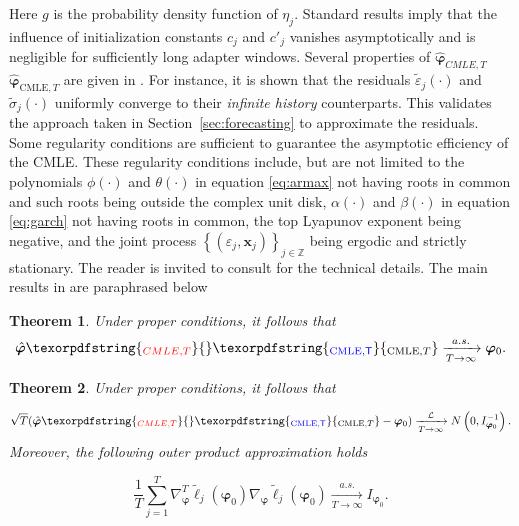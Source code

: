 \documentclass[10pt,a4paper,oneside]{article}
\newcommand{\Z}{\mathbb{Z}}
\newtheorem{theorem}{Theorem}
\providecommand{\DIFaddtex}[1]{{\protect\color{blue} \sf #1}} %
\providecommand{\DIFdeltex}[1]{{\protect\color{red} \scriptsize #1}} %
\providecommand{\DIFaddbegin}{} %
\providecommand{\DIFaddend}{} %
\providecommand{\DIFdelbegin}{} %
\providecommand{\DIFdelend}{} %
\providecommand{\DIFadd}[1]{\texorpdfstring{\DIFaddtex{#1}}{#1}} %
\providecommand{\DIFdel}[1]{\texorpdfstring{\DIFdeltex{#1}}{}} %
\newcommand{\DIFscaledelfig}{0.5}
\newlength{\DIFdelgraphicswidth} %
\newlength{\DIFdelgraphicsheight} %
\newcommand{\DIFaddincludegraphics}[2][]{{\color{blue}\fbox{\DIFOincludegraphics[#1]{#2}}}} %
\newcommand{\DIFdelincludegraphics}[2][]{%
\sbox{\DIFdelgraphicsbox}{\DIFOincludegraphics[#1]{#2}}%
\settoboxwidth{\DIFdelgraphicswidth}{\DIFdelgraphicsbox} %
\settoboxtotalheight{\DIFdelgraphicsheight}{\DIFdelgraphicsbox} %
\scalebox{\DIFscaledelfig}{%
\parbox[b]{\DIFdelgraphicswidth}{\usebox{\DIFdelgraphicsbox}\\[-\baselineskip] \rule{\DIFdelgraphicswidth}{0em}}\llap{\resizebox{\DIFdelgraphicswidth}{\DIFdelgraphicsheight}{%
\setlength{\unitlength}{\DIFdelgraphicswidth}%
\begin{picture}(1,1)%
\thicklines\linethickness{2pt} %
{\color[rgb]{1,0,0}\put(0,0){\framebox(1,1){}}}%
{\color[rgb]{1,0,0}\put(0,0){\line( 1,1){1}}}%
{\color[rgb]{1,0,0}\put(0,1){\line(1,-1){1}}}%
\end{picture}%
}\hspace*{3pt}}} %
} %
\DeclareRobustCommand{\DIFaddbegin}{\DIFOaddbegin \let\includegraphics\DIFaddincludegraphics} %
\DeclareRobustCommand{\DIFaddend}{\DIFOaddend \let\includegraphics\DIFOincludegraphics} %
\DeclareRobustCommand{\DIFdelbegin}{\DIFOdelbegin \let\includegraphics\DIFdelincludegraphics} %
\DeclareRobustCommand{\DIFdelend}{\DIFOaddend \let\includegraphics\DIFOincludegraphics} %
\begin{document}
Here $g$ is the probability density function of $\eta_j$. Standard results imply that the influence of initialization constants $c_j$ and $c'_j$ vanishes asymptotically and is negligible for sufficiently long adapter windows. Several properties of \DIFdelbegin \DIFdel{$\hat{\boldsymbol{\varphi}}_{CMLE, T}$ }\DIFdelend \DIFaddbegin \DIFadd{$\hat{\boldsymbol{\varphi}}_{\mathrm{CMLE}, T}$ }\DIFaddend are given in \cite{mejia2025asymptotic}. For instance, it is shown that the residuals $\tilde{\varepsilon}_j(\cdot)$ and $\tilde{\sigma}_j(\cdot)$ uniformly converge to their \textit{infinite history} counterparts. This validates the approach taken in Section~\ref{sec:forecasting} to approximate the residuals. Some regularity conditions are sufficient to guarantee the asymptotic efficiency of the CMLE. These regularity conditions include, but are not limited to the polynomials $\phi(\cdot)$ and $\theta(\cdot)$ in equation \eqref{eq:armax} not having roots in common and such roots being outside the complex unit disk, $\alpha(\cdot)$ and $\beta(\cdot)$ in equation \eqref{eq:garch} not having roots in common, the top Lyapunov exponent being negative, and the joint process $\left\{ \left( \varepsilon_j, \mathbf{x}_j \right)  \right\}_{j \in \Z}$ being ergodic and strictly stationary. The reader is invited to consult \cite{mejia2025asymptotic} for the technical details. The main results in \cite{mejia2025asymptotic} are paraphrased below

\begin{theorem}
    Under proper conditions, it follows that
    $$
        \hat{\boldsymbol{\varphi}}\DIFdelbegin \DIFdel{_{CMLE, T} }\DIFdelend \DIFaddbegin \DIFadd{_{\mathrm{CMLE}, T} }\DIFaddend \xrightarrow[T \rightarrow \infty]{a.s.} \boldsymbol{\varphi}_0.
    $$
    \label{thm:consistency}
\end{theorem}

\begin{theorem}
    Under proper conditions, it follows that

    $$
        \sqrt{T} (\hat{\boldsymbol{\varphi}}\DIFdelbegin \DIFdel{_{CMLE, T} }\DIFdelend \DIFaddbegin \DIFadd{_{\mathrm{CMLE}, T} }\DIFaddend - \boldsymbol{\varphi}_0) \xrightarrow[T \rightarrow \infty]{\mathcal{L}} N \left(0, I^{-1}_{\boldsymbol{\varphi}_0} \right).
    $$
    Moreover, the following outer product approximation holds

    $$
        \frac{1}{T} \sum^T_{j = 1} \nabla^T_{\boldsymbol{\varphi}} \tilde{\ell}_j(\boldsymbol{\varphi}_0) \nabla_{\boldsymbol{\varphi}} \tilde{\ell}_j(\boldsymbol{\varphi}_0) \xrightarrow[T \rightarrow \infty]{a.s.} I_{\boldsymbol{\varphi}_0}.
    $$
    \label{thm:asymptotic_normality}
\end{theorem}
\end{document}
